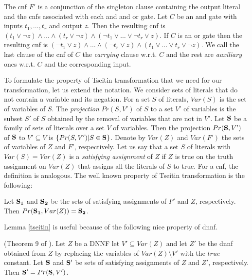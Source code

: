 \documentclass{llncs}
\begin{document}
The {\sc cnf} $F'$ is a conjunction of the singleton clause containing the output literal and the 
{\sc cnf}s associated with each {\sc and} and {\sc or} gate. Let $C$ be an {\sc and} gate with inputs 
$t_1, \dots, t_r$ and output $z$. Then the resulting {\sc cnf} is 
$(t_1 \vee \neg z) \wedge \dots \wedge(t_r \vee \neg z) \wedge (\neg t_1 \vee \dots \vee \neg t_r \vee z)$. 
If $C$ is an {\sc or} gate then the resulting {\sc cnf} is 
$(\neg t_1 \vee z) \wedge \dots \wedge (\neg t_r \vee z) \wedge (t_1 \vee \dots \vee t_r \vee \neg z)$.
We call the last clause of the {\sc cnf} of $C$ the \emph{carrying} clause w.r.t. $C$ and the rest 
are \emph{auxiliary} ones w.r.t. $C$ and the corresponding input. 

To formulate the property of Tseitin transformation that we need for our transformation, let us extend
the notation. We consider sets of literals that do not contain a variable and its negation.
For a set $S$ of literals, $Var(S)$ is the set of variables of $S$. 
The \emph{projection} $Pr(S,V')$ of $S$ to a set $V'$ of variables is the subset $S'$ of $S$ 
obtained by the removal of variables that are not in $V'$.
Let ${\bf S}$ be a family of sets of literals over a set $V$ of variables. Then the projection
$Pr({\bf S},V')$ of ${\bf S}$ to $V' \subseteq V$ is $\{Pr(S,V')|S \in {\bf S}\}$.
Denote by $Var(Z)$ and $Var(F')$ the sets of variables of $Z$ and $F'$, respectively. Let us say
that a set $S$ of literals with $Var(S)=Var(Z)$ is a \emph{satisfying assignment} of $Z$ if $Z$ is
true on the truth assignment on $Var(Z)$ that assigns all the literals of $S$ to true. For a {\sc cnf},
the definition is analogous. The well known property of Tseitin transformation is the following:

\begin{lemma} \label{tseitin}
Let ${\bf S_1}$ and ${\bf S_2}$ be the sets of satisfying assignments of $F'$ and $Z$,
respectively. Then $Pr({\bf S_1},Var(Z))={\bf S_2}$.
\end{lemma}

Lemma \ref{tseitin} is useful because of the following nice property of {\sc dnnf}.
\begin{lemma} \label{dnnfproj} (Theorem 9 of \cite{DarwicheJACM}).
Let $Z$ be a DNNF let $V' \subseteq Var(Z)$ and let $Z'$ be the {\sc dnnf} obtained from $Z$
by replacing the variables of $Var(Z) \setminus V'$ with the $true$ constant.
Let ${\bf S}$ and ${\bf S'}$ be sets of satisfying assignments of $Z$ and $Z'$, respectively.
Then ${\bf S'}=Pr({\bf S},V')$. 
\end{lemma}
\end{document}
